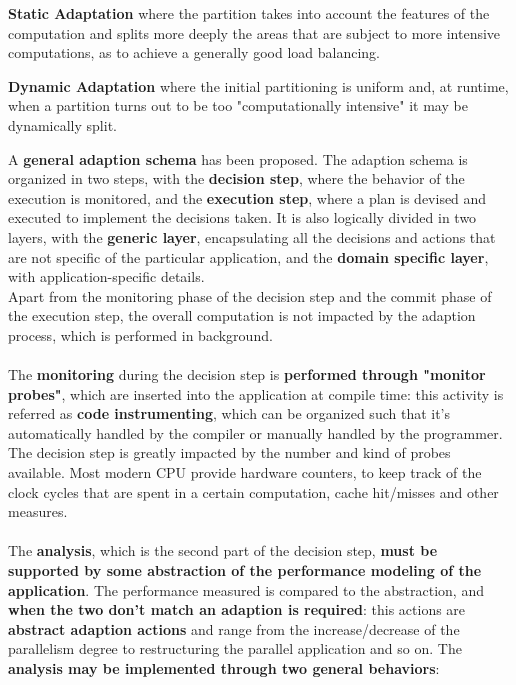 \documentclass[10pt]{report}
\begin{document}
\begin{list}{}{}
	\item \textbf{Static Adaptation} where the partition takes into account the features of the computation and splits more deeply the areas that are subject to more intensive computations, as to achieve a generally good load balancing.
	\item \textbf{Dynamic Adaptation} where the initial partitioning is uniform and, at runtime, when a partition turns out to be too "computationally intensive" it may be dynamically split.
\end{list}
A \textbf{general adaption schema} has been proposed. The adaption schema is organized in two steps, with the \textbf{decision step}, where the behavior of the execution is monitored, and the \textbf{execution step}, where a plan is devised and executed to implement the decisions taken. It is also logically divided in two layers, with the \textbf{generic layer}, encapsulating all the decisions and actions that are not specific of the particular application, and the \textbf{domain specific layer}, with application-specific details.\\
Apart from the monitoring phase of the decision step and the commit phase of the execution step, the overall computation is not impacted by the adaption process, which is performed in background.\\\\
The \textbf{monitoring} during the decision step is \textbf{performed through "monitor probes"}, which are inserted into the application at compile time: this activity is referred as \textbf{code instrumenting}, which can be organized such that it's automatically handled by the compiler or manually handled by the programmer. The decision step is greatly impacted by the number and kind of probes available. Most modern CPU provide hardware counters, to keep track of the clock cycles that are spent in a certain computation, cache hit/misses and other measures.\\\\
The \textbf{analysis}, which is the second part of the decision step, \textbf{must be supported by some abstraction of the performance modeling of the application}. The performance measured is compared to the abstraction, and \textbf{when the two don't match an adaption is required}: this actions are \textbf{abstract adaption actions} and range from the increase/decrease of the parallelism degree to restructuring the parallel application and so on. The \textbf{analysis may be implemented through two general behaviors}:
\end{document}
